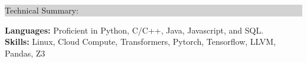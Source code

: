 \documentclass{article} %
\newcommand{\rsection}[1]{
  \hspace{-0.4cm}\vspace{0.1cm}
\colorbox{lightgrey}{
\begin{minipage}{1.07\linewidth}
\vspace{0.22cm}
\fontsize{14pt}{16pt}\selectfont #1
\vspace{0.12cm}
\end{minipage}
}
\vspace*{-0.1cm}
}
\newcommand{\rjob}[2]{
  \hspace*{-0.3cm}
{\fontsize{10pt}{12pt}\selectfont #1} \hfill #2
\vspace*{0.1cm}
\hspace*{-1.2cm}
}
\newenvironment{ritemize}{
\hspace*{-0.8cm}
\begin{minipage}{1.05\linewidth}
\begin{itemize}
}{
\end{itemize}
\end{minipage}
}
\newcommand{\ritem}{
\item[-]
}
\begin{document}




\rsection{Technical Summary:}

\hspace*{-0.3cm}
\textbf{Languages:} Proficient in Python, C/C++, Java, Javascript, and SQL. \\
\hspace*{-0.3cm}
\textbf{Skills:} Linux, Cloud Compute, Transformers, Pytorch, Tensorflow, LLVM, Pandas, Z3
\end{document}
